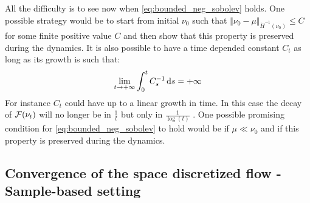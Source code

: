 All the difficulty is to see now when \cref{eq:bounded_neg_sobolev} holds. One possible strategy would be to start from initial $\nu_0$ such that $\Vert \nu_0  - \mu \Vert_{\dot{H}^{-1}(\nu_0)} \leq C $  for some finite positive value $C$ and then show that this property is preserved during the dynamics. It is also possible to have a time depended constant $C_t$ as long as its growth is such that:
\begin{align}
	\lim_{t\rightarrow +\infty} \int_0^t C_s^{-1}\mathop{}\!\mathrm{d} s = +\infty
\end{align}
For instance $C_t$ could have up to a linear growth in time. In this case the decay of ${{\mathcal F}}(\nu_t)$ will no longer be in $\frac{1}{t}$ but only in $\frac{1}{\log(t)}$ .
One possible promising condition for \cref{eq:bounded_neg_sobolev} to hold would be if $\mu \ll \nu_0$ and if this property is preserved during the dynamics.


 
 
 
 
 
 \subsection{Convergence of the space discretized flow - Sample-based setting}
 
